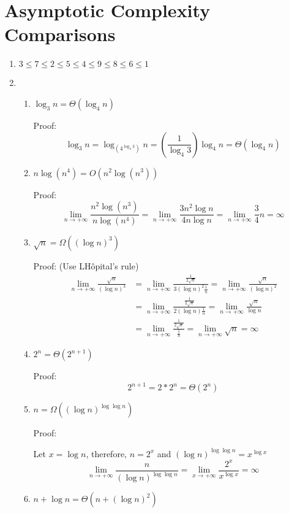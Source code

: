 \documentclass[11pt]{article}
\newenvironment{qparts}{\begin{enumerate}[{(}a{)}]}{\end{enumerate}}
\begin{document}
\section{Asymptotic Complexity Comparisons}
\begin{qparts}
\item 
$3 \leq  7 \leq 2 \leq 5 \leq 4 \leq 9 \leq 8 \leq 6 \leq 1$

\item 
\renewcommand{\theenumii}{\roman{enumii}}
\begin{enumerate}
  \item $\log_3n = \Theta(\log_4n)$
  
  Proof:
  \[
	 \log_3n  =  \log_{(4^{\log_4 3})}n = (\frac{1}{\log_4 3})\log_4n = \Theta(\log_4n)
 \]
  \item $n\log(n^4) = O(n^2\log(n^3))$
  
  Proof:
 \[
  	\lim_{n \to +\infty} \frac{n^2\log(n^3)}{n\log(n^4)} = \lim_{n \to +\infty} \frac{3n^2\log n}{4n\log n} = \lim_{n \to +\infty} \frac{3}{4}n = \infty
 \]
 
 \item $\sqrt{n} = \Omega((\log n)^3)$
 
 Proof: (Use L\textquotesingle Hôpital's rule)
 \begin{align*}
 	\lim_{n \to+\infty} \frac{\sqrt{n}}{(\log n)^3} 
	&= \lim_{n \to+\infty} \frac{\frac{1}{2\sqrt{n}}}{3(\log n)^2\frac{1}{n}} = \lim_{n \to+\infty} \frac{\sqrt{n}}{(\log n)^2} \\
	&= \lim_{n \to+\infty} \frac{\frac{1}{2\sqrt{n}}}{2(\log n)\frac{1}{n}} = \lim_{n \to+\infty} \frac{\sqrt{n}}{\log n} \\
	&= \lim_{n \to+\infty} \frac{\frac{1}{2\sqrt{n}}}{\frac{1}{n}} = \lim_{n \to+\infty} \sqrt{n} = \infty
 \end{align*}
 
 \item $2^n = \Theta(2^{n+1})$
 
 Proof:
 \[
 	2^{n+1} = 2 * 2^n = \Theta(2^n)
 \]
 
 \item $n = \Omega((\log n)^{\log \log n})$
 
 Proof:
 
 Let $x = \log n$, therefore, $n = 2^x$ and $(\log n)^{\log \log n} = x^{\log x}$
 \[
 	\lim_{n \to+\infty} \frac{n}{(\log n)^{\log \log n}} = \lim_{x \to+\infty} \frac{2^x}{ x^{\log x}} = \infty
 \]
 
 \item $n + \log n = \Theta(n + (\log n)^2)$
 

\end{enumerate}
\end{qparts}
\end{document}
